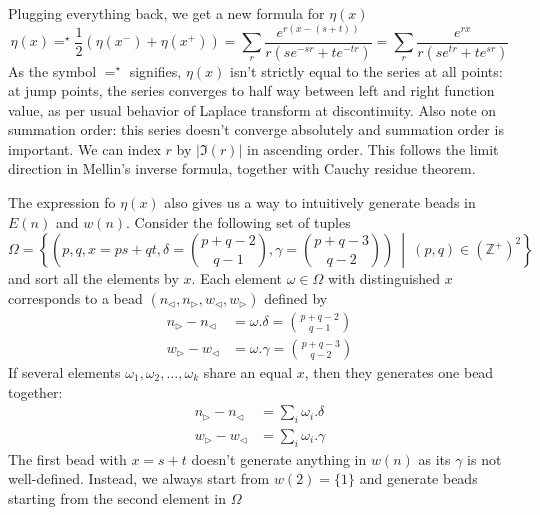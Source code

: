 \documentclass[]{article}
\begin{document}
Plugging everything back, we get a new formula for $\eta(x)$
\[
\eta(x) =^{\star} \frac{1}{2}(\eta(x^-) + \eta(x^+)) = \sum_r \frac{e^{r(x - (s +t))}}{r(s e^{-sr} + t e^{-tr})}  = \sum_r \frac{e^{rx}}{r(s e^{tr} + t e^{sr})}
\]
As the symbol $=^{\star}$ signifies, $\eta(x)$ isn't strictly equal to the series at all points: at jump points, the series converges to half way between left and right function value, as per usual behavior of Laplace transform at discontinuity. Also note on summation order: this series doesn't converge absolutely and summation order is important. We can index $r$ by $|\mathfrak{I}(r)|$ in ascending order. This follows the limit direction in Mellin's inverse formula, together with Cauchy residue theorem.

The expression fo $\eta(x)$ also gives us a way to intuitively generate beads in $E(n)$ and $w(n)$. Consider the following set of tuples 
\[
\Omega = \left\{\left(p,q, x=ps+qt, \delta=\binom{p+q-2}{q-1}, \gamma=\binom{p+q-3}{q-2}  \right)\ \middle|\ (p,q)\in(\mathbb{Z}^+)^2 \right\}
\]
and sort all the elements by $x$. Each element $\omega\in\Omega$ with distinguished $x$ corresponds to a bead $(n_{\triangleleft}, n_{\triangleright}, w_{\triangleleft}, w_{\triangleright})$ defined by
\begin{align}
n_{\triangleright} - n_{\triangleleft} &= \omega.\delta=\binom{p+q-2}{q-1}\\
w_{\triangleright} - w_{\triangleleft} &= \omega.\gamma=\binom{p+q-3}{q-2}
\end{align}
If several elements $\omega_1,\omega_2,\dots,\omega_k$ share an equal $x$, then they generates one bead together:
\begin{align}
n_{\triangleright} - n_{\triangleleft} &= \sum_i \omega_i.\delta\\
w_{\triangleright} - w_{\triangleleft} &= \sum_i \omega_i.\gamma
\end{align}
The first bead with $x=s+t$ doesn't generate anything in $w(n)$ as its $\gamma$ is not well-defined. Instead, we always start from $w(2) = \{1\}$ and generate beads starting from the second element in $\Omega$
\end{document}
